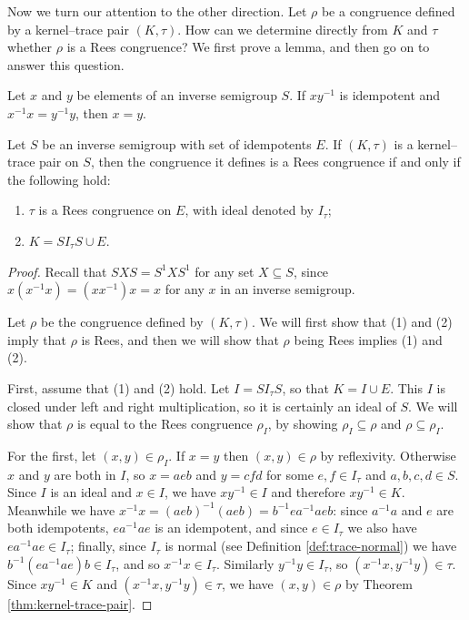 Now we turn our attention to the other direction.  Let $\rho$ be a congruence
defined by a kernel--trace pair $(K, \tau)$.  How can we determine directly from
$K$ and $\tau$ whether $\rho$ is a Rees congruence?  We first prove a lemma, and
then go on to answer this question.

\begin{lemma}
  \label{lem:xly}
  Let $x$ and $y$ be elements of an inverse semigroup $S$.  If $xy^{-1}$ is
  idempotent and $x^{-1}x = y^{-1}y$, then $x = y$.
\end{lemma}

\begin{theorem}
  \label{thm:kertr-to-rees}
  Let $S$ be an inverse semigroup with set of idempotents $E$.  If $(K, \tau)$
  is a kernel--trace pair on $S$, then the congruence it defines is a Rees
  congruence if and only if the following hold:
  \begin{enumerate}[\rm(1)]
  \item $\tau$ is a Rees congruence on $E$, with ideal denoted by $I_\tau$;
  \item $K = S I_\tau S \cup E$.
  \end{enumerate}
  \begin{proof}
    Recall that $SXS = S^1XS^1$ for any set $X \subseteq S$, since
    $x(x^{-1}x)=(xx^{-1})x=x$ for any $x$ in an inverse semigroup.

    Let $\rho$ be the congruence defined by $(K, \tau)$.  We will first show
    that (1) and (2) imply that $\rho$ is Rees, and then we will show that
    $\rho$ being Rees implies (1) and (2).

    First, assume that (1) and (2) hold.  Let $I = S I_\tau S$, so that
    $K = I \cup E$.  This $I$ is closed under left and right multiplication, so
    it is certainly an ideal of $S$.  We will show that $\rho$ is equal to the
    Rees congruence $\rho_I$, by showing $\rho_I \subseteq \rho$ and
    $\rho \subseteq \rho_I$.

    For the first, let $(x,y) \in \rho_I$.  If $x=y$ then $(x,y) \in \rho$ by
    reflexivity.  Otherwise $x$ and $y$ are both in $I$, so $x = aeb$ and
    $y=cfd$ for some $e,f \in I_\tau$ and $a,b,c,d \in S$.  Since $I$ is an
    ideal and $x \in I$, we have $xy^{-1} \in I$ and therefore $xy^{-1} \in K$.
    Meanwhile we have $x^{-1}x = (aeb)^{-1}(aeb) = b^{-1}ea^{-1}aeb$: since
    $a^{-1}a$ and $e$ are both idempotents, $ea^{-1}ae$ is an idempotent, and
    since $e \in I_\tau$ we also have $ea^{-1}ae \in I_\tau$; finally, since
    $I_\tau$ is normal (see Definition \ref{def:trace-normal}) we have
    $b^{-1}(ea^{-1}ae)b \in I_\tau$, and so $x^{-1}x \in I_\tau$.  Similarly
    $y^{-1}y \in I_\tau$, so $(x^{-1}x, y^{-1}y) \in \tau$.  Since
    $xy^{-1} \in K$ and $(x^{-1}x, y^{-1}y) \in \tau$, we have $(x,y) \in \rho$
    by Theorem \ref{thm:kernel-trace-pair}.


\end{proof}
\end{theorem}
